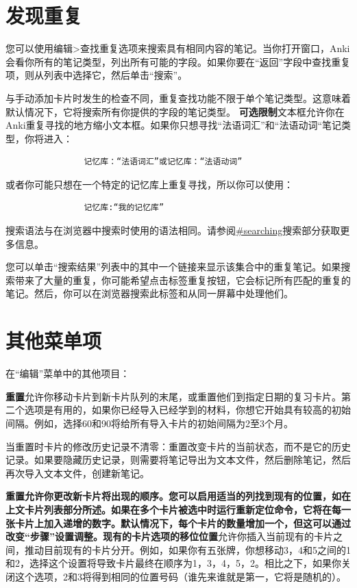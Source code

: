 \documentclass[a4paper]{book}
\begin{document}
			\section{发现重复}
			您可以使用编辑>查找重复选项来搜索具有相同内容的笔记。当你打开窗口，Anki会看你所有的笔记类型，列出所有可能的字段。如果你要在“返回”字段中查找重复项，则从列表中选择它，然后单击“搜索”。
			
			与手动添加卡片时发生的检查不同，重复查找功能不限于单个笔记类型。这意味着默认情况下，它将搜索所有你提供的字段的笔记类型。
			\textbf{可选限制}文本框允许你在Anki重复寻找的地方缩小文本框。如果你只想寻找“法语词汇”和“法语动词“笔记类型，你将进入：
			
			\begin{shaded}\begin{verbatim}
				记忆库：“法语词汇”或记忆库：“法语动词”
				\end{verbatim}\end{shaded}
			
			或者你可能只想在一个特定的记忆库上重复寻找，所以你可以使用：
			
			\begin{shaded}\begin{verbatim}
				记忆库:“我的记忆库”
				\end{verbatim}\end{shaded}
			
			搜索语法与在浏览器中搜索时使用的语法相同。请参阅\url{#searching}搜索部分获取更多信息。
			
			您可以单击“搜索结果”列表中的其中一个链接来显示该集合中的重复笔记。如果搜索带来了大量的重复，你可能希望点击标签重复按钮，它会标记所有匹配的重复的笔记。然后，你可以在浏览器搜索此标签和从同一屏幕中处理他们。
			
			\section{其他菜单项}
			在“编辑”菜单中的其他项目：
			
			\textbf{重置}允许你移动卡片到新卡片队列的末尾，或重置他们到指定日期的复习卡片。第二个选项是有用的，如果你已经导入已经学到的材料，你想它开始具有较高的初始间隔。例如，选择60和90将给所有导入卡片的初始间隔为2至3个月。
			
			当重置时卡片的修改历史记录不清零：重置改变卡片的当前状态，而不是它的历史记录。如果要隐藏历史记录，则需要将笔记导出为文本文件，然后删除笔记，然后再次导入文本文件，创建新笔记。
			
			\textbf{重置允许你更改新卡片将出现的顺序。您可以启用适当的列找到现有的位置，如在上文卡片列表部分所述。如果在多个卡片被选中时运行重新定位命令，它将在每一张卡片上加入递增的数字。默认情况下，每个卡片的数量增加一个，但这可以通过改变“步骤”设置调整。现有的卡片选项的移位位置}允许你插入当前现有的卡片之间，推动目前现有的卡片分开。例如，如果你有五张牌，你想移动3，4和5之间的1和2，选择这个设置将导致卡片最终在顺序为1，3，4，5，2。相比之下，如果你关闭这个选项，2和3将得到相同的位置号码（谁先来谁就是第一，它将是随机的）。
			
\end{document}
